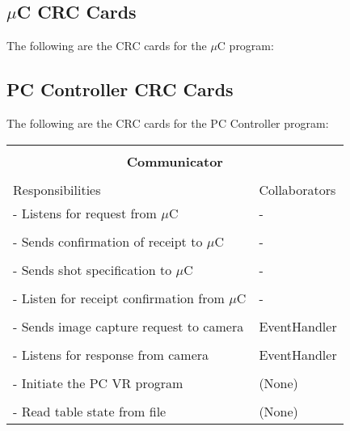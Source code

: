 \documentclass[titlepage]{article}
\begin{document}
\subsection{$\mu$C CRC Cards}
The following are the CRC cards for the $\mu$C program:\\

\subsection{PC Controller CRC Cards}
The following are the CRC cards for the PC Controller program:\\
\begin{table}[!htbp]%
\centering
\begin{tabular}{| p{} | p{} |}\hline
	\multicolumn{2}{|l|}{}\\
	\multicolumn{2}{|c|}{\large{\textbf{Communicator}}}\\
	\multicolumn{2}{|l|}{}\\\hline
	\vspace{0mm}\large{Responsibilities}\vspace{2mm} &\vspace{0mm}\large{Collaborators}\vspace{2mm}\\\hline
	\vspace{0mm}- Listens for request from $\mu$C	&\vspace{0mm}-\\&\\
	- Sends confirmation of receipt to $\mu$C		&-\\&\\
	- Sends shot specification to $\mu$C			&-\\&\\
	- Listen for receipt confirmation from $\mu$C	&-\\&\\
	- Sends image capture request to camera			&EventHandler\\&\\
	- Listens for response from camera				&EventHandler\\&\\
	- Initiate the PC VR program					&(None)\\&\\
	- Read table state from file\vspace{2mm}		&(None)\vspace{2mm}\\\hline
\end{tabular}
\end{table}
\end{document}

